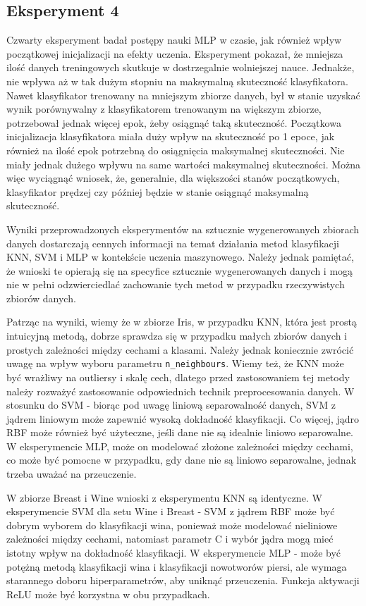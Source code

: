 \documentclass[12pt]{article}
\begin{document}
\subsection*{Eksperyment 4}
Czwarty eksperyment badał postępy nauki MLP w czasie, jak również wpływ początkowej inicjalizacji na efekty uczenia.
Eksperyment pokazał, że mniejsza ilość danych treningowych skutkuje w dostrzegalnie wolniejszej nauce.
Jednakże, nie wpływa aż w tak dużym stopniu na maksymalną skuteczność klasyfikatora. Nawet klasyfikator trenowany na mniejszym zbiorze danych, był w stanie uzyskać wynik porównywalny z klasyfikatorem trenowanym na większym zbiorze, potrzebował jednak więcej epok, żeby osiągnąć taką skuteczność.
Początkowa inicjalizacja klasyfikatora miała duży wpływ na skuteczność po 1 epoce, jak również na ilość epok potrzebną do osiągnięcia maksymalnej skuteczności.
Nie miały jednak dużego wpływu na same wartości maksymalnej skuteczności.
Można więc wyciągnąć wniosek, że, generalnie, dla większości stanów początkowych, klasyfikator prędzej czy później będzie w stanie osiągnąć maksymalną skuteczność.

\clearpage

Wyniki przeprowadzonych eksperymentów na sztucznie wygenerowanych zbiorach danych dostarczają cennych informacji na temat działania metod klasyfikacji KNN, SVM i MLP w kontekście uczenia maszynowego. Należy jednak pamiętać, że wnioski te opierają się na specyfice sztucznie wygenerowanych danych i mogą nie w pełni odzwierciedlać zachowanie tych metod w przypadku rzeczywistych zbiorów danych.

Patrząc na wyniki, wiemy że w zbiorze Iris, w przypadku KNN, która jest prostą intuicyjną metodą, dobrze sprawdza się w przypadku małych zbiorów danych i prostych zależności między cechami a klasami.
Należy jednak koniecznie zwrócić uwagę na wpływ wyboru parametru \texttt{n\_neighbours}.
Wiemy też, że KNN może być wrażliwy na outliersy i skalę cech, dlatego przed zastosowaniem tej metody należy rozważyć zastosowanie odpowiednich technik preprocesowania danych.
W stosunku do SVM - biorąc pod uwagę liniową separowalność danych, SVM z jądrem liniowym może zapewnić wysoką dokładność klasyfikacji.
Co więcej, jądro RBF może również być użyteczne, jeśli dane nie są idealnie liniowo separowalne.
W eksperymencie MLP, może on modelować złożone zależności między cechami, co może być pomocne w przypadku, gdy dane nie są liniowo separowalne, jednak trzeba uważać na przeuczenie.

W zbiorze Breast i Wine wnioski z eksperymentu KNN są identyczne.
W eksperymencie SVM dla setu Wine i Breast - SVM z jądrem RBF może być dobrym wyborem do klasyfikacji wina, ponieważ może modelować nieliniowe zależności między cechami, natomiast parametr C i wybór jądra mogą mieć istotny wpływ na dokładność klasyfikacji.
W eksperymencie MLP - może być potężną metodą klasyfikacji wina i klasyfikacji nowotworów piersi, ale wymaga starannego doboru hiperparametrów, aby uniknąć przeuczenia.
Funkcja aktywacji ReLU może być korzystna w obu przypadkach.
\end{document}
